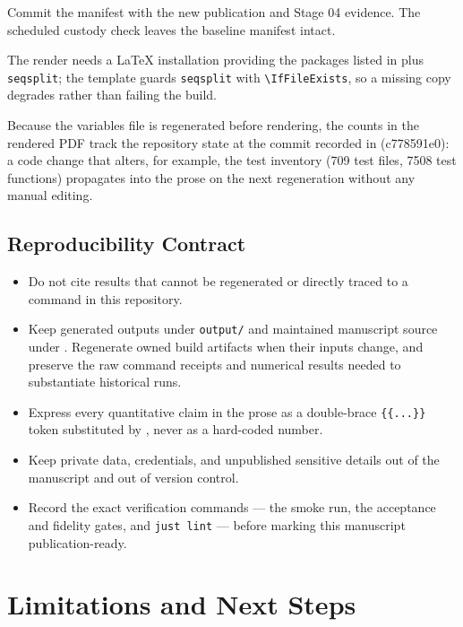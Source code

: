 \documentclass[
  english,
  9pt,
]{extarticle}
\providecommand{\tightlist}{%
  \setlength{\itemsep}{0pt}\setlength{\parskip}{0pt}}
\begin{document}
Commit the manifest with the new publication and Stage 04 evidence. The
scheduled custody check leaves the baseline manifest intact.

The render needs a LaTeX installation providing the packages listed in
 plus \texttt{seqsplit}; the
template guards \texttt{seqsplit} with
\texttt{\textbackslash{}IfFileExists}, so a missing copy degrades rather
than failing the build.

Because the variables file is regenerated before rendering, the counts
in the rendered PDF track the repository state at the commit recorded in
 (c778591e0): a code
change that alters, for example, the test inventory (709 test files,
7508 test functions) propagates into the prose on the next regeneration
without any manual editing.

\subsection{Reproducibility Contract}\label{reproducibility-contract}

\begin{itemize}
\tightlist
\item
  Do not cite results that cannot be regenerated or directly traced to a
  command in this repository.
\item
  Keep generated outputs under \texttt{output/} and maintained
  manuscript source under . Regenerate owned
  build artifacts when their inputs change, and preserve the raw command
  receipts and numerical results needed to substantiate historical runs.
\item
  Express every quantitative claim in the prose as a double-brace
  \texttt{\{\{...\}\}} token substituted by
  , never as a
  hard-coded number.
\item
  Keep private data, credentials, and unpublished sensitive details out
  of the manuscript and out of version control.
\item
  Record the exact verification commands --- the smoke run, the
  acceptance and fidelity gates, and \texttt{just\ lint} --- before
  marking this manuscript publication-ready.
\end{itemize}

\newpage

\section{Limitations and Next Steps}\label{sec:limitations_next_steps}
\end{document}
